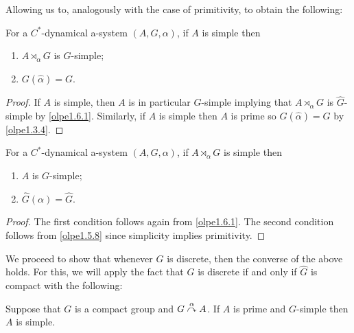 Allowing us to, analogously with the case of primitivity, to obtain the following:
\begin{proposition}	
	For a $C^*$-dynamical a-system $(A,G,\alpha)$, if $A$ is simple then
	\begin{enumerate}[nosep]
	\item $A \rtimes_\alpha G$ is $\hat G$-simple;
	\item $G(\hat \alpha) = G$.
\end{enumerate}
\end{proposition}
\begin{proof}
	If $A$ is simple, then $A$ is in particular $G$-simple implying that $A \rtimes_\alpha G$ is $\hat G$-simple by \cref{olpe1.6.1}. Similarly, if $A$ is simple then $A$ is prime so $G(\hat \alpha) = G$ by \cref{olpe1.3.4}.
\end{proof}
\begin{proposition}
	For a $C^*$-dynamical a-system $(A,G,\alpha)$, if $A \rtimes_\alpha G$ is simple then 
	\begin{enumerate}[nosep]
		\item $A$ is $G$-simple;
		\item $\hat G(\alpha)= \hat G$.
	\end{enumerate}
	\label{olpe1.6.3}
\end{proposition}
\begin{proof}
	The first condition follows again from \cref{olpe1.6.1}. The second condition follows from \cref{olpe1.5.8} since simplicity implies primitivity.
\end{proof}
We proceed to show that whenever $G$ is discrete, then the converse of the above holds. For this, we will apply the fact that $G$ is discrete if and only if $\hat G$ is compact with the following:
\begin{lemma}
	Suppose that $G$ is a compact group and $G \stackrel{\alpha}{\curvearrowright} A$. If $A$ is prime and $G$-simple then $A$ is simple.	
	\label{olpe1.6.4}
\end{lemma}
